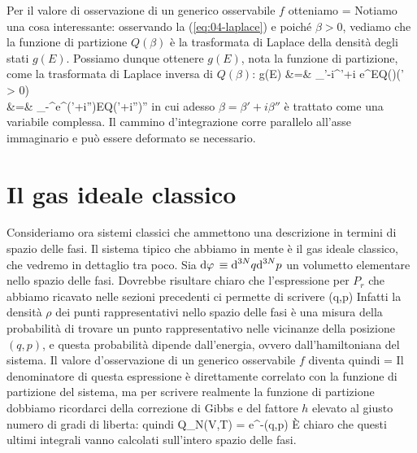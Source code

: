 \ee
Per il valore di osservazione di un generico osservabile $f$ otteniamo
\be
{} = 
\ee
Notiamo una cosa interessante: osservando la (\ref{eq:04-laplace}) e poiché $\beta > 0$, vediamo che la funzione di partizione $Q(\beta)$ è la trasformata di Laplace della densità degli stati $g(E)$. Possiamo dunque ottenere $g(E)$, nota la funzione di partizione, come la trasformata di Laplace inversa di $Q(\beta)$:
\bea
\label{eq:04-gfromq}
g(E) &=& \int_{\beta'-i\infty}^{\beta'+i\infty} e^{\beta E}Q(\beta)\de\beta\quad(\beta' > 0)
\nonumber \\
&=& \int_{-\infty}^{\infty}e^{(\beta'+i\beta'')E}Q(\beta'+i\beta'')\de\beta''
\eea
in cui adesso $\beta = \beta' + i\beta''$ è trattato come una variabile complessa. Il cammino d'integrazione corre parallelo all'asse immaginario e può essere deformato se necessario.

\section{Il gas ideale classico}
\label{sec:04-gas-ideale}

Consideriamo ora sistemi classici che ammettono una descrizione in termini di spazio delle fasi. Il sistema tipico che abbiamo in mente è il gas ideale classico, che vedremo in dettaglio tra poco. Sia ${\textrm d}\varphi\, \equiv {\textrm d}^{3N}q{\textrm d}^{3N}p$ un volumetto elementare nello spazio delle fasi. Dovrebbe risultare chiaro che l'espressione per $P_r$ che abbiamo ricavato nelle sezioni precedenti ci permette di scrivere
\be
\rho(q,p) \propto {}
\ee
Infatti la densità $\rho$ dei punti rappresentativi nello spazio delle fasi è una misura della probabilità di trovare un punto rappresentativo nelle vicinanze della posizione $(q,p)$, e questa probabilità dipende dall'energia, ovvero dall'hamiltoniana del sistema. Il valore d'osservazione di un generico osservabile $f$ diventa quindi
\be
{} = 
\ee
Il denominatore di questa espressione è direttamente correlato con la funzione di partizione del sistema, ma per scrivere realmente la funzione di partizione dobbiamo ricordarci della correzione di Gibbs e del fattore $h$ elevato al giusto numero di gradi di liberta: quindi
\be
Q_N(V,T) = \int e^{-\beta\Ham(q,p)}\dephi
\ee
\`E chiaro che questi ultimi integrali vanno calcolati sull'intero spazio delle fasi.

